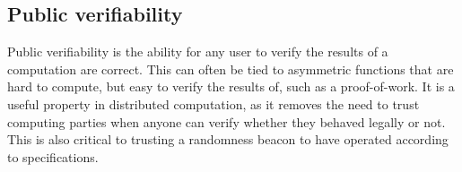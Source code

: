 \subsection{Public verifiability}
Public verifiability is the ability for any user to verify the results of a computation are correct. This can often be tied to asymmetric functions that are hard to compute, but easy to verify the results of, such as a proof-of-work. It is a useful property in distributed computation, as it removes the need to trust computing parties when anyone can verify whether they behaved legally or not. This is also critical to trusting a randomness beacon to have operated according to specifications. 